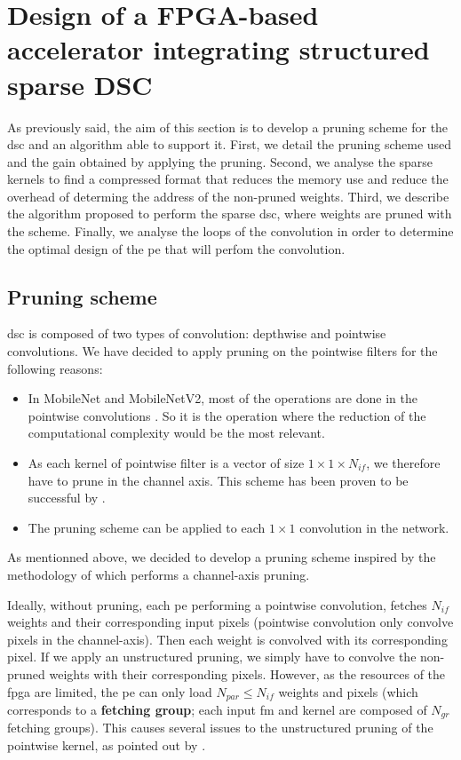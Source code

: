 \section{Design of a FPGA-based accelerator integrating structured sparse DSC} \label{sec:design}
%
%
As previously said,  the aim of this section is to develop a pruning scheme for the \acrshort{dsc} and an algorithm able to support it. First, we detail the pruning scheme used and the gain obtained by applying the pruning. Second, we analyse the sparse kernels to find a compressed format that reduces the memory use and reduce the overhead of determing the address of the non-pruned weights. Third, we describe the algorithm proposed to perform the sparse \acrshort{dsc}, where weights are pruned with the scheme. Finally, we analyse the loops of the convolution in order to determine the optimal design of the \acrshort{pe} that will perfom the convolution.
%
\subsection{Pruning scheme} \label{subsec:pscheme}
%
\acrshort{dsc} is composed of two types of convolution: depthwise and pointwise convolutions. We have decided to apply pruning on the pointwise filters for the following reasons:
%
\begin{itemize}
    \item In MobileNet and MobileNetV2, most of the operations are done in the pointwise convolutions \cite{zhang_channel_2019, tu_pruning_2019}. So it is the operation where the reduction of the computational complexity would be the most relevant.
    \item As each kernel of pointwise filter is a vector of size $1 \times 1  \times N_{if}$, we therefore have to prune in the channel axis. This scheme has been proven to be successful by \textcite{kang_accelerator-aware_2020}.
    \item The pruning scheme can be applied to each $1 \times 1$ convolution in the network.
\end{itemize}
%
As mentionned above, we decided to develop a pruning scheme inspired by the methodology of \textcite{kang_accelerator-aware_2020} which performs a channel-axis pruning.

Ideally, without pruning, each \acrshort{pe} performing a pointwise convolution, fetches $N_{if}$ weights and their corresponding input pixels (pointwise convolution only convolve pixels in the channel-axis). Then each weight is convolved with its corresponding pixel. If we apply an unstructured pruning, we simply have to convolve the non-pruned weights with their corresponding pixels. However, as the resources of the \acrshort{fpga} are limited, the \acrshort{pe} can only load $N_{par} \leq N_{if}$ weights and pixels (which corresponds to a \textbf{fetching group}; each input \acrshort{fm} and kernel are composed of $N_{gr}$ fetching groups). This causes several issues to the unstructured pruning of the pointwise kernel, as pointed out by \cite{kang_accelerator-aware_2020}.

